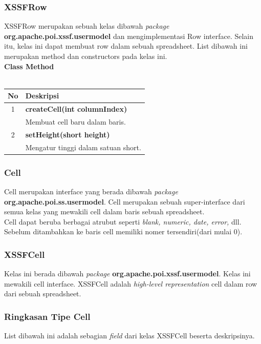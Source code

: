 \subsubsection{XSSFRow}
XSSFRow merupakan sebuah kelas dibawah \textit{package} \textbf{org.apache.poi.xssf.usermodel} dan mengimplementasi Row interface. Selain itu, kelas ini dapat membuat row dalam sebuah spreadsheet. List dibawah ini merupakan method dan constructors pada kelas ini.\cite{tutpoint}
 \\ 
\noindent \textbf{Class Method}\\ \\
	\begin{tabular}{|c|p{12cm}|}
		\hline
		\textbf{No} & \textbf{Deskripsi} \\ \hline \hline
		1 & \textbf{createCell(int columnIndex)}\\
			&	Membuat cell baru dalam baris.\\ \hline 
		2 & \textbf{setHeight(short height)}\\
			&	Mengatur tinggi dalam satuan short.\\ \hline
	\end{tabular}

\subsubsection{Cell}
Cell merupakan interface yang berada dibawah \textit{package} \textbf{org.apache.poi.ss.usermodel}. Cell merupakan sebuah super-interface dari semua kelas yang mewakili cell dalam baris sebuah spreadsheet.\\

Cell dapat beruba berbagai atrubut seperti \textit{blank, numeric, date, error, } dll. Sebelum ditambahkan ke baris cell memiliki nomer tersendiri(dari mulai 0).\cite{tutpoint}

\subsubsection{XSSFCell}  
Kelas ini berada dibawah \textit{package} \textbf{org.apache.poi.xssf.usermodel}. Kelas ini mewakili cell interface. XSSFCell adalah \textit{high-level representation} cell dalam row dari sebuah spreadsheet.\cite{tutpoint}

\subsubsection{Ringkasan Tipe Cell}
List dibawah ini adalah sebagian \textit{field} dari kelas XSSFCell beserta deskripsinya.\\

